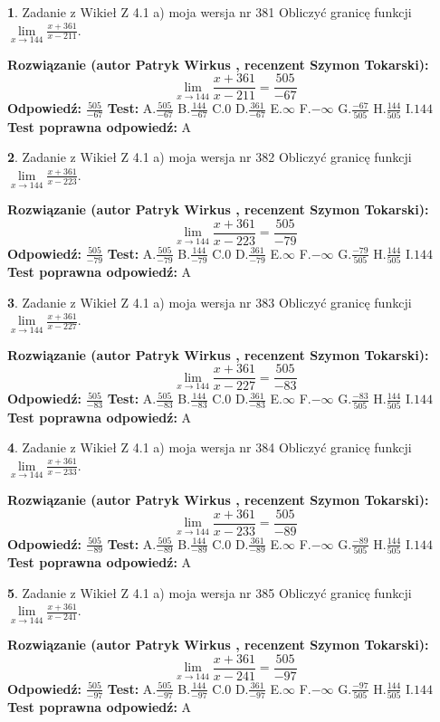 \documentclass[12pt, a4paper]{article}
\theoremstyle{definition} %
\newtheorem{zad}{}
\newcommand{\zadStart}[1]{\begin{zad}#1\newline}
\newcommand{\zadStop}{\end{zad}}
\newcommand{\rozwStart}[2]{\noindent \textbf{Rozwiązanie (autor #1 , recenzent #2): }\newline}
\newcommand{\rozwStop}{\newline}
\newcommand{\odpStart}{\noindent \textbf{Odpowiedź:}\newline}
\newcommand{\odpStop}{\newline}
\newcommand{\testStart}{\noindent \textbf{Test:}\newline}
\newcommand{\testStop}{\newline}
\newcommand{\kluczStart}{\noindent \textbf{Test poprawna odpowiedź:}\newline}
\newcommand{\kluczStop}{\newline}
\begin{document}
\zadStart{Zadanie z Wikieł Z 4.1 a) moja wersja nr 381}
Obliczyć granicę funkcji $\lim\limits_{x\to144}\frac{x+361}{x-211}$.
\zadStop
\rozwStart{Patryk Wirkus}{Szymon Tokarski}
$$\lim\limits_{x\to144}\frac{x+361}{x-211} = \frac{505}{-67}$$
\rozwStop
\odpStart
$\frac{505}{-67}$
\odpStop
\testStart
A.$\frac{505}{-67}$
B.$\frac{144}{-67}$
C.$0$
D.$\frac{361}{-67}$
E.$\infty$
F.$-\infty$
G.$\frac{-67}{505}$
H.$\frac{144}{505}$
I.$144$
\testStop
\kluczStart
A
\kluczStop



\zadStart{Zadanie z Wikieł Z 4.1 a) moja wersja nr 382}
Obliczyć granicę funkcji $\lim\limits_{x\to144}\frac{x+361}{x-223}$.
\zadStop
\rozwStart{Patryk Wirkus}{Szymon Tokarski}
$$\lim\limits_{x\to144}\frac{x+361}{x-223} = \frac{505}{-79}$$
\rozwStop
\odpStart
$\frac{505}{-79}$
\odpStop
\testStart
A.$\frac{505}{-79}$
B.$\frac{144}{-79}$
C.$0$
D.$\frac{361}{-79}$
E.$\infty$
F.$-\infty$
G.$\frac{-79}{505}$
H.$\frac{144}{505}$
I.$144$
\testStop
\kluczStart
A
\kluczStop



\zadStart{Zadanie z Wikieł Z 4.1 a) moja wersja nr 383}
Obliczyć granicę funkcji $\lim\limits_{x\to144}\frac{x+361}{x-227}$.
\zadStop
\rozwStart{Patryk Wirkus}{Szymon Tokarski}
$$\lim\limits_{x\to144}\frac{x+361}{x-227} = \frac{505}{-83}$$
\rozwStop
\odpStart
$\frac{505}{-83}$
\odpStop
\testStart
A.$\frac{505}{-83}$
B.$\frac{144}{-83}$
C.$0$
D.$\frac{361}{-83}$
E.$\infty$
F.$-\infty$
G.$\frac{-83}{505}$
H.$\frac{144}{505}$
I.$144$
\testStop
\kluczStart
A
\kluczStop



\zadStart{Zadanie z Wikieł Z 4.1 a) moja wersja nr 384}
Obliczyć granicę funkcji $\lim\limits_{x\to144}\frac{x+361}{x-233}$.
\zadStop
\rozwStart{Patryk Wirkus}{Szymon Tokarski}
$$\lim\limits_{x\to144}\frac{x+361}{x-233} = \frac{505}{-89}$$
\rozwStop
\odpStart
$\frac{505}{-89}$
\odpStop
\testStart
A.$\frac{505}{-89}$
B.$\frac{144}{-89}$
C.$0$
D.$\frac{361}{-89}$
E.$\infty$
F.$-\infty$
G.$\frac{-89}{505}$
H.$\frac{144}{505}$
I.$144$
\testStop
\kluczStart
A
\kluczStop



\zadStart{Zadanie z Wikieł Z 4.1 a) moja wersja nr 385}
Obliczyć granicę funkcji $\lim\limits_{x\to144}\frac{x+361}{x-241}$.
\zadStop
\rozwStart{Patryk Wirkus}{Szymon Tokarski}
$$\lim\limits_{x\to144}\frac{x+361}{x-241} = \frac{505}{-97}$$
\rozwStop
\odpStart
$\frac{505}{-97}$
\odpStop
\testStart
A.$\frac{505}{-97}$
B.$\frac{144}{-97}$
C.$0$
D.$\frac{361}{-97}$
E.$\infty$
F.$-\infty$
G.$\frac{-97}{505}$
H.$\frac{144}{505}$
I.$144$
\testStop
\kluczStart
A
\kluczStop
\end{document}
